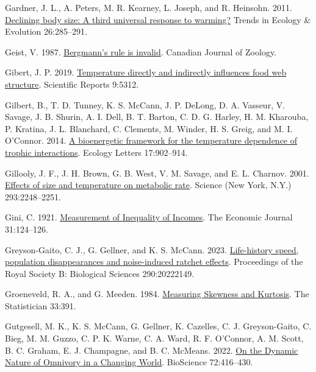 \documentclass[
]{article}
\newlength{\cslhangindent}
\newlength{\cslentryspacingunit} %
\newenvironment{CSLReferences}[2] %
 {%
  \setlength{\parindent}{0pt}
  \ifodd #1
  \let\oldpar\par
  \def\par{\hangindent=\cslhangindent\oldpar}
  \fi
  \setlength{\parskip}{#2\cslentryspacingunit}
 }%
 {}
\numberwithin{equation}
\begin{document}
\begin{CSLReferences}{1}{0}
\leavevmode{}%
Gardner, J. L., A. Peters, M. R. Kearney, L. Joseph, and R. Heinsohn.
2011. \href{https://doi.org/10.1016/j.tree.2011.03.005}{Declining body
size: A third universal response to warming?} Trends in Ecology \&
Evolution 26:285--291.

\leavevmode{}%
Geist, V. 1987. \href{https://doi.org/10.1139/z87-164}{Bergmann's rule
is invalid}. Canadian Journal of Zoology.

\leavevmode{}%
Gibert, J. P. 2019.
\href{https://doi.org/10.1038/s41598-019-41783-0}{Temperature directly
and indirectly influences food web structure}. Scientific Reports
9:5312.

\leavevmode{}%
Gilbert, B., T. D. Tunney, K. S. McCann, J. P. DeLong, D. A. Vasseur, V.
Savage, J. B. Shurin, A. I. Dell, B. T. Barton, C. D. G. Harley, H. M.
Kharouba, P. Kratina, J. L. Blanchard, C. Clements, M. Winder, H. S.
Greig, and M. I. O'Connor. 2014.
\href{https://doi.org/10.1111/ele.12307}{A bioenergetic framework for
the temperature dependence of trophic interactions}. Ecology Letters
17:902--914.

\leavevmode{}%
Gillooly, J. F., J. H. Brown, G. B. West, V. M. Savage, and E. L.
Charnov. 2001. \href{https://doi.org/10.1126/science.1061967}{Effects of
size and temperature on metabolic rate}. Science (New York, N.Y.)
293:2248--2251.

\leavevmode{}%
Gini, C. 1921. \href{https://doi.org/10.2307/2223319}{Measurement of
{Inequality} of {Incomes}}. The Economic Journal 31:124--126.

\leavevmode{}%
Greyson-Gaito, C. J., G. Gellner, and K. S. McCann. 2023.
\href{https://doi.org/10.1098/rspb.2022.2149}{Life-history speed,
population disappearances and noise-induced ratchet effects}.
Proceedings of the Royal Society B: Biological Sciences 290:20222149.

\leavevmode{}%
Groeneveld, R. A., and G. Meeden. 1984.
\href{https://doi.org/10.2307/2987742}{Measuring {Skewness} and
{Kurtosis}}. The Statistician 33:391.

\leavevmode{}%
Gutgesell, M. K., K. S. McCann, G. Gellner, K. Cazelles, C. J.
Greyson-Gaito, C. Bieg, M. M. Guzzo, C. P. K. Warne, C. A. Ward, R. F.
O'Connor, A. M. Scott, B. C. Graham, E. J. Champagne, and B. C. McMeans.
2022. \href{https://doi.org/10.1093/biosci/biab144}{On the {Dynamic
Nature} of {Omnivory} in a {Changing World}}. BioScience 72:416--430.


\end{CSLReferences}
\end{document}
